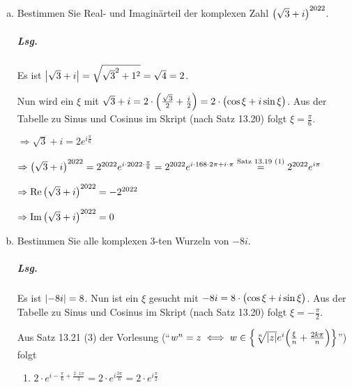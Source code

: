 \documentclass{scrreprt}
\begin{document}
\begin{enumerate}[(a)]
\item Bestimmen Sie Real- und Imaginärteil der komplexen Zahl
  $\qty\big(\sqrt{3} + i)^{2022}$.

  \subparagraph{Lsg.} Es ist $\abs{\sqrt{3} + i} = \sqrt{\sqrt{3}^2 + 1^2}
  = \sqrt{4} = 2$.

  Nun wird ein $\xi$ mit
  $\sqrt{3} + i = 2 \cdot \qty\Big(\frac{\sqrt{3}}{2} + \frac{i}{2})
  = 2 \cdot \qty\big(\cos \xi + i \sin \xi)$.
  Aus der Tabelle zu Sinus und Cosinus im Skript (nach Satz 13.20) folgt
  $\xi = \frac{\pi}{6}$.

  $\Rightarrow \sqrt{3} + i = 2 e^{i \frac{\pi}{6}}$

  $\Rightarrow \qty\big(\sqrt{3} + i)^{2022}
  = 2^{2022} e^{i \cdot 2022 \cdot \frac{\pi}{6}}
  = 2^{2022} e^{i \cdot 168 \cdot 2\pi + i \cdot \pi}
  \overset{\text{Satz 13.19 (1)}}= 2^{2022} e^{i \pi}$


  $\Rightarrow \Re \qty\big(\sqrt{3} + i)^{2022} = - 2^{2022}$

  $\Rightarrow \Im \qty\big(\sqrt{3} + i)^{2022} = 0$

\item Bestimmen Sie alle komplexen 3-ten Wurzeln von $-8i$.

  \subparagraph{Lsg.} Es ist $\abs{-8i} = 8$.
  Nun ist ein $\xi$ gesucht mit $-8i = 8 \cdot \qty\big(\cos \xi + i \sin \xi)$.
  Aus der Tabelle zu Sinus und Cosinus im Skript (nach Satz 13.20) folgt
  $\xi = -\frac{\pi}{2}$.

  Aus Satz 13.21 (3) der Vorlesung (``$w^n = z \iff
  w \in \qty{\sqrt[n]{\abs{z}}e^i\qty(\frac{\xi}{n} + \frac{2k\pi}{n})}$'')
  folgt
  \begin{enumerate}[label={$w_{\arabic*} =$}]
  \item $2 \cdot e^{i -\frac{\pi}{6} + \frac{2 \cdot 1 \pi}{3}}
    = 2 \cdot e^{i \frac{3\pi}{6}} = 2 \cdot e^{i \frac{\pi}{2}}$


\end{enumerate}
\end{enumerate}
\end{document}
